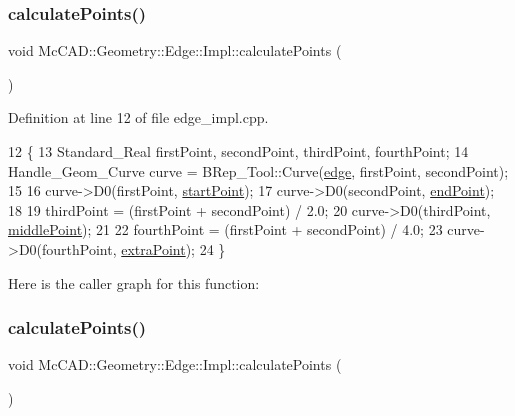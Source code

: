\subsubsection{\texorpdfstring{calculate\+Points()}{calculatePoints()}\hspace{0.1cm}{\footnotesize\ttfamily [1/2]}}
{\footnotesize\ttfamily void Mc\+C\+A\+D\+::\+Geometry\+::\+Edge\+::\+Impl\+::calculate\+Points (\begin{DoxyParamCaption}{ }\end{DoxyParamCaption})}



Definition at line 12 of file edge\+\_\+impl.\+cpp.


\begin{DoxyCode}
12                                       \{
13   Standard\_Real firstPoint, secondPoint, thirdPoint, fourthPoint;
14   Handle\_Geom\_Curve curve = BRep\_Tool::Curve(\hyperlink{classMcCAD_1_1Geometry_1_1Edge_1_1Impl_af6c62d8c4fb496f202ea8029a1304f5c}{edge}, firstPoint, secondPoint);
15 
16   curve->D0(firstPoint, \hyperlink{classMcCAD_1_1Geometry_1_1Edge_1_1Impl_a6479fc79c6b3f2b3a9e3b779da28229d}{startPoint});
17   curve->D0(secondPoint, \hyperlink{classMcCAD_1_1Geometry_1_1Edge_1_1Impl_afbde348ebff5e60146f75af3710ca3f7}{endPoint});
18 
19   thirdPoint = (firstPoint + secondPoint) / 2.0;
20   curve->D0(thirdPoint, \hyperlink{classMcCAD_1_1Geometry_1_1Edge_1_1Impl_a4b64052006993b74a81d32a073332f67}{middlePoint});
21 
22   fourthPoint = (firstPoint + secondPoint) / 4.0;
23   curve->D0(fourthPoint, \hyperlink{classMcCAD_1_1Geometry_1_1Edge_1_1Impl_a998153a75faa821a38038a5051290673}{extraPoint});
24 \}
\end{DoxyCode}
Here is the caller graph for this function\+:
\mbox{\label{classMcCAD_1_1Geometry_1_1Edge_1_1Impl_a6541fcc122721729d3f0f3001be3a8fa}} 
\subsubsection{\texorpdfstring{calculate\+Points()}{calculatePoints()}\hspace{0.1cm}{\footnotesize\ttfamily [2/2]}}
{\footnotesize\ttfamily void Mc\+C\+A\+D\+::\+Geometry\+::\+Edge\+::\+Impl\+::calculate\+Points (\begin{DoxyParamCaption}{ }\end{DoxyParamCaption})}

